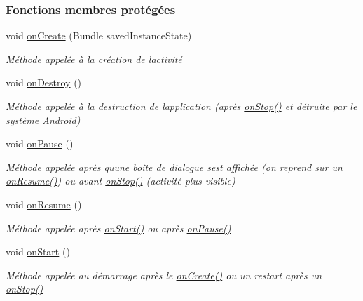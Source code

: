 \subsubsection*{Fonctions membres protégées}
\begin{DoxyCompactItemize}
\item 
void \hyperlink{classcom_1_1example_1_1ekawa_1_1_ihm_af37a1d1d731eaed5e9cc19d23475ede3}{on\+Create} (Bundle saved\+Instance\+State)
\begin{DoxyCompactList}\small\item\em Méthode appelée à la création de l\textquotesingle{}activité \end{DoxyCompactList}\item 
void \hyperlink{classcom_1_1example_1_1ekawa_1_1_ihm_a5ae27969ec39afede5d0cd36b469f145}{on\+Destroy} ()
\begin{DoxyCompactList}\small\item\em Méthode appelée à la destruction de l\textquotesingle{}application (après \hyperlink{classcom_1_1example_1_1ekawa_1_1_ihm_adc7bc6671d8cd5018724bcbf4fbc0d75}{on\+Stop()} et détruite par le système Android) \end{DoxyCompactList}\item 
void \hyperlink{classcom_1_1example_1_1ekawa_1_1_ihm_a4cf2ee6861e571d2634a4dd2492e9be9}{on\+Pause} ()
\begin{DoxyCompactList}\small\item\em Méthode appelée après qu\textquotesingle{}une boîte de dialogue s\textquotesingle{}est affichée (on reprend sur un \hyperlink{classcom_1_1example_1_1ekawa_1_1_ihm_aec9b38c2990ae4bdee8df0b49253120f}{on\+Resume()}) ou avant \hyperlink{classcom_1_1example_1_1ekawa_1_1_ihm_adc7bc6671d8cd5018724bcbf4fbc0d75}{on\+Stop()} (activité plus visible) \end{DoxyCompactList}\item 
void \hyperlink{classcom_1_1example_1_1ekawa_1_1_ihm_aec9b38c2990ae4bdee8df0b49253120f}{on\+Resume} ()
\begin{DoxyCompactList}\small\item\em Méthode appelée après \hyperlink{classcom_1_1example_1_1ekawa_1_1_ihm_a5cf91e6625760cbdca208988a08e86f6}{on\+Start()} ou après \hyperlink{classcom_1_1example_1_1ekawa_1_1_ihm_a4cf2ee6861e571d2634a4dd2492e9be9}{on\+Pause()} \end{DoxyCompactList}\item 
void \hyperlink{classcom_1_1example_1_1ekawa_1_1_ihm_a5cf91e6625760cbdca208988a08e86f6}{on\+Start} ()
\begin{DoxyCompactList}\small\item\em Méthode appelée au démarrage après le \hyperlink{classcom_1_1example_1_1ekawa_1_1_ihm_af37a1d1d731eaed5e9cc19d23475ede3}{on\+Create()} ou un restart après un \hyperlink{classcom_1_1example_1_1ekawa_1_1_ihm_adc7bc6671d8cd5018724bcbf4fbc0d75}{on\+Stop()} \end{DoxyCompactList}\item 

\end{DoxyCompactItemize}
